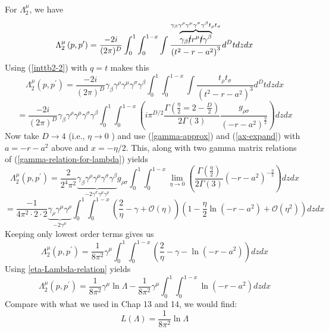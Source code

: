 For $\Lambda_2^{\mu}$, we have
\begin{equation}\Lambda_{2}^{\mu}\left(p, p^{\prime}\right)=\frac{-2 i}{(2 \pi)^{D}} \int_{0}^{1} \int_{0}^{1-x} \int \frac{\overbrace{\gamma_{\beta} \cancel{t} r^{\mu} \cancel{t} \gamma^{\beta}}^{\gamma_{\beta} \gamma^{\rho} \gamma^{\mu} \gamma^{\sigma} \gamma^{\beta} t_{\rho} t_{\sigma}}}{\left(t^{2}-r-a^{2}\right)^{3}} d^{D} t d z d x\end{equation}
Using (\ref{inttb2-2}) with $q=t$ makes this
$$\Lambda_{2}^{\mu}\left(p, p^{\prime}\right)=\frac{-2 i}{(2 \pi)^{D}} \gamma_{\beta} \gamma^{\rho} \gamma^{\mu} \gamma^{\sigma} \gamma^{\beta} \int_{0}^{1} \int_{0}^{1-x} \int \frac{t_{\rho} t_{\sigma}}{\left(t^{2}-r-a^{2}\right)^{3}} d^{D} t d z d x$$
$$=\frac{-2 i}{(2 \pi)^{D}} \gamma_{\beta} \gamma^{\rho} \gamma^{\mu} \gamma^{\sigma} \gamma^{\beta} \int_{0}^{1} \int_{0}^{1-x}\left(i \pi^{D / 2} \frac{\Gamma\left(\frac{\eta}{2}=2-\frac{D}{2}\right)}{2 \Gamma(3)} \frac{g_{\rho \sigma}}{\left(-r-a^{2}\right)^{\frac{\eta}{2}}}\right) d z d x$$
Now take $D \rightarrow 4$ (i.e., $\eta \rightarrow 0$ ) and use (\ref{gamma-approx}) and (\ref{ax-expand}) with $a=-r-a^{2}$ above and $x=-\eta / 2 .$ This, along with two gamma matrix relations of (\ref{gamma-relation-for-lambda}) yields
$$\Lambda_{2}^{\mu}\left(p, p^{\prime}\right)=\frac{2}{2^{4} \pi^{2}} \underbrace{\gamma_{\beta} \gamma^{\rho} \gamma^{\mu} \gamma^{\sigma} \gamma^{\beta}}_{-2 \gamma^{\sigma} \gamma^{\mu} \gamma^{\rho}} g_{\rho \sigma}\int_{0}^{1} \int_{0}^{1-x} \lim _{\eta \rightarrow 0}\left(\frac{\Gamma\left(\frac{\eta}{2}\right)}{2 \Gamma(3)}\left(-r-a^{2}\right)^{-\frac{\eta}{2}}\right) d z d x
$$
$$=\frac{-1}{4 \pi^{2} \cdot 2 \cdot 2} \underbrace{\gamma_{\rho} \gamma^{\mu} \gamma^{\rho}}_{-2 \gamma^{\mu}} \int_{0}^{1} \int_{0}^{1-x}\left(\frac{2}{\eta}-\gamma+\mathcal{O}(\eta)\right)\left(1-\frac{\eta}{2} \ln \left(-r-a^{2}\right)+\mathcal{O}\left(\eta^{2}\right)\right) d z d x$$
Keeping only lowest order terms gives us
$$\Lambda_{2}^{\mu}\left(p, p^{\prime}\right)=\frac{1}{8 \pi^{2}} \gamma^{\mu} \int_{0}^{1} \int_{0}^{1-x}\left(\frac{2}{\eta}-\gamma-\ln \left(-r-a^{2}\right)\right) d z d x$$
Using \ref{eta-Lambda-relation} yields
\begin{equation}
\Lambda_{2}^{\mu}\left(p, p^{\prime}\right)=\frac{1}{8 \pi^{2}} \gamma^{\mu} \ln \Lambda-\frac{1}{8 \pi^{2}} \gamma^{\mu} \int_{0}^{1} \int_{0}^{1-x} \ln \left(-r-a^{2}\right) d z d x\end{equation}
Compare with what we used in Chap 13 and 14, we would find:
\begin{equation}
L(\Lambda)=\frac{1}{8 \pi^{2}} \ln \Lambda
\end{equation}

